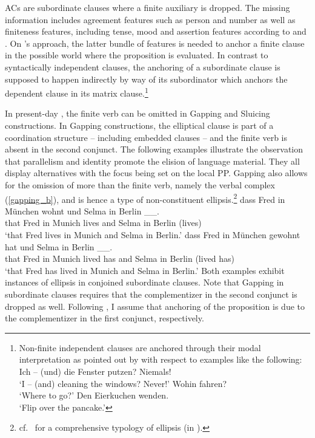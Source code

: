 \documentclass[output=paper,colorlinks,citecolor=brown]{langscibook}
\begin{document}
ACs are subordinate clauses where a finite auxiliary is dropped. The missing information includes agreement features such as person and number as well as finiteness features, including tense, mood and assertion features according to \textcite{klein2006} and \textcite{repp2009}. On \textcite{repp2009}'s approach, the latter bundle of features is needed to anchor a finite clause in the possible world where the proposition is evaluated. In contrast to syntactically independent clauses, the anchoring of a subordinate clause is supposed to happen indirectly by way of its subordinator which anchors the dependent clause in its matrix clause.\footnote{Non-finite independent clauses are anchored through their modal interpretation as pointed out by \citet{reis2003} with respect to examples like the following:
\eal
\ex 
\glt Ich -- (und) die Fenster putzen? Niemals! \\ `I -- (and) cleaning the windows? Never!'
\ex 
\glt Wohin fahren? \\ `Where to go?'
\ex 
\glt Den Eierkuchen wenden. \\ `Flip over the pancake.'
\zl
} 

In present-day , the finite verb can be omitted in Gapping and Sluicing constructions. In Gapping constructions, the elliptical clause is part of a coordination structure -- including embedded clauses -- and the finite verb is absent in the second conjunct. The following examples illustrate the observation that parallelism and identity promote the elision of language material. They all display alternatives with the focus being set on the local PP. Gapping also allows for the omission of more than the finite verb, namely the verbal complex (\ref{gapping_b}), and is hence a type of non-constituent ellipsis.\footnote{cf.\ \citet{reich2011} for a comprehensive typology of ellipsis (in ).} 
\eal \label{gapping_a}
\ex  
\gll dass Fred in München wohnt und Selma in Berlin \_\_. \\ that Fred in Munich lives and Selma in Berlin (lives)  \\ 
\glt `that Fred lives in Munich and Selma in Berlin.'
\ex \label{gapping_b} 
\gll dass Fred in München gewohnt hat und Selma in Berlin \_\_. \\ that Fred in Munich lived has and Selma in Berlin (lived has)  \\
\glt `that Fred has lived in Munich and Selma in Berlin.'
\zl
Both examples exhibit instances of ellipsis in conjoined subordinate clauses. Note that Gapping in subordinate clauses requires that the complementizer in the second conjunct is dropped as well. Following \citet{repp2009}, I assume that anchoring of the proposition is due to the complementizer in the first conjunct, respectively. 
\end{document}
